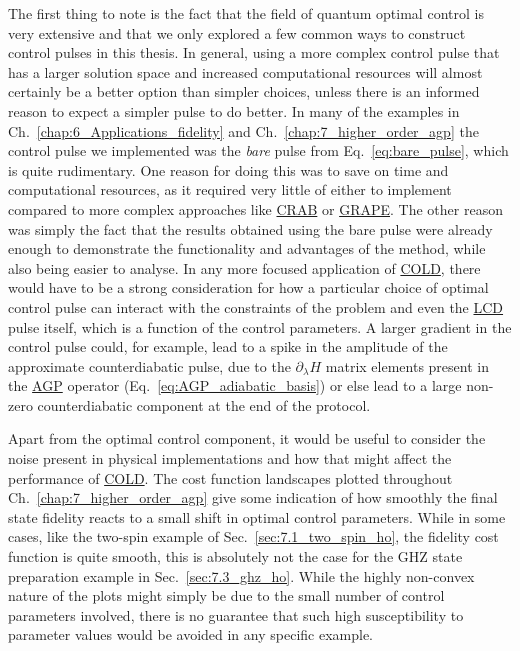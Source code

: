 \documentclass[a4paper,oneside,11pt]{book}
\newcommand{\dlambda}{\partial_{\lambda}}
\newcommand{\acrref}[1]{\hyperref[acr:#1]{#1}}
\begin{document}
The first thing to note is the fact that the field of quantum optimal control is very extensive and that we only explored a few common ways to construct control pulses in this thesis. In general, using a more complex control pulse that has a larger solution space and increased computational resources will almost certainly be a better option than simpler choices, unless there is an informed reason to expect a simpler pulse to do better. In many of the examples in Ch.~\ref{chap:6_Applications_fidelity} and Ch.~\ref{chap:7_higher_order_agp} the control pulse we implemented was the \emph{bare} pulse from Eq.~\eqref{eq:bare_pulse}, which is quite rudimentary. One reason for doing this was to save on time and computational resources, as it required very little of either to implement compared to more complex approaches like \acrref{CRAB} or \acrref{GRAPE}. The other reason was simply the fact that the results obtained using the bare pulse were already enough to demonstrate the functionality and advantages of the method, while also being easier to analyse. In any more focused application of \acrref{COLD}, there would have to be a strong consideration for how a particular choice of optimal control pulse can interact with the constraints of the problem and even the \acrref{LCD} pulse itself, which is a function of the control parameters. A larger gradient in the control pulse could, for example, lead to a spike in the amplitude of the approximate counterdiabatic pulse, due to the $\dlambda H$ matrix elements present in the \acrref{AGP} operator (Eq.~\eqref{eq:AGP_adiabatic_basis}) or else lead to a large non-zero counterdiabatic component at the end of the protocol. 

Apart from the optimal control component, it would be useful to consider the noise present in physical implementations and how that might affect the performance of \acrref{COLD}. The cost function landscapes plotted throughout Ch.~\ref{chap:7_higher_order_agp} give some indication of how smoothly the final state fidelity reacts to a small shift in optimal control parameters. While in some cases, like the two-spin example of Sec.~\ref{sec:7.1_two_spin_ho}, the fidelity cost function is quite smooth, this is absolutely not the case for the GHZ state preparation example in Sec.~\ref{sec:7.3_ghz_ho}. While the highly non-convex nature of the plots might simply be due to the small number of control parameters involved, there is no guarantee that such high susceptibility to parameter values would be avoided in any specific example.
\end{document}
